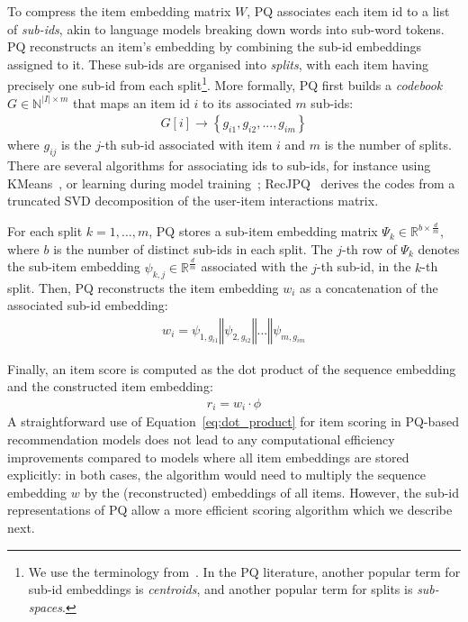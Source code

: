\documentclass[sigconf,natbib=true, review=true]{acmart} %
\newcommand{\pageenlarge}[1]{\marginnote{#1}\enlargethispage{#1\baselineskip}}
\newcommand{\rsasha}[1]{\textcolor[HTML]{FF0000}{#1}}
\begin{document}
 To compress the item embedding matrix $W$, PQ associates each item id to a list of {\em sub-ids}, akin to language models breaking down words into sub-word tokens. PQ reconstructs an item's embedding by combining the sub-id embeddings assigned to it. These sub-ids are organised into {\em splits}, with each item having precisely one sub-id from each split\footnote{We use the terminology from~\cite{petrovRecJPQTrainingLargeCatalogue2024}. In the PQ literature, another popular term for sub-id embeddings is \emph{centroids}, and another popular term for splits is \emph{sub-spaces}.}. More formally, PQ first builds a \emph{codebook} $G\in\mathbb{N}^{|I|\times m}$ that maps an item id $i$ to its associated $m$ sub-ids:
\begin{align}
    G[i] \rightarrow \left\{g_{i1}, g_{i2}, ..., g_{im}\right\} \label{eq:sub_ids_map}
\end{align}
where $g_{ij}$ is the $j$-th sub-id associated with item $i$ and $m$ is the number of splits. There are several algorithms for associating ids to sub-ids, for instance using KMeans~\citemissing{}, or learning during model training~\cite{chenDifferentiableProductQuantization2020}; 
RecJPQ~\cite{petrovRecJPQTrainingLargeCatalogue2024} derives the codes from a truncated SVD decomposition of the user-item interactions matrix. 

For each split $k=1,\ldots,m$, PQ stores a sub-item embedding matrix $\Psi_k \in \mathbb{R}^{b\times\frac{d}{m}}$, where $b$ is the number of distinct sub-ids in each split. The $j$-th row of $\Psi_k$ denotes the sub-item embedding $\psi_{k,j} \in \mathbb{R}^{\frac{d}{m}}$ associated with the $j$-th sub-id, in the $k$-th split.
Then, PQ reconstructs the item embedding $w_i$ as a concatenation of the associated sub-id embedding: 
\begin{align}
    w_i =  \psi_{1,g_{i1}} \mathbin\Vert \psi_{2,g_{i2}}  \mathbin\Vert ... \mathbin\Vert  \psi_{m,g_{im}} \label{eq:pq:item_embedding}
\end{align}

\pageenlarge{3}
Finally, an item score is computed as the dot product of the sequence embedding and the constructed item embedding: 
\begin{align}
    r_i = w_i \cdot \phi\label{eq:dot_product}
\end{align}
 A straightforward use of Equation~\eqref{eq:dot_product} for item scoring in PQ-based recommendation models does not lead to any computational efficiency improvements compared to models where all item embeddings are stored explicitly: \rsasha{in both cases, the algorithm would need to multiply the sequence embedding $w$  by the (reconstructed) embeddings of all items.}
However, \rsasha{the sub-id representations of} PQ \rsasha{allow} a more efficient scoring algorithm \rsasha{which we describe next}. 
\end{document}
